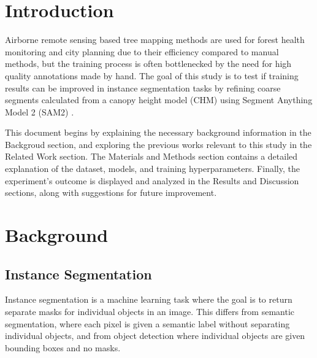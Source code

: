 \documentclass[english, 12pt, a4paper, sci, utf8, a-2b, online]{aaltothesis}
\begin{document}
\cleardoublepage

\section{Introduction}
\label{sec:intro}

\thispagestyle{empty}

Airborne remote sensing based tree mapping methods are used for forest health monitoring \cite{ecke} and city planning \cite{velasquez} due to their efficiency compared to manual methods, but the training process is often bottlenecked by the need for high quality annotations made by hand. 
The goal of this study is to test if training results can be improved in instance segmentation tasks by refining coarse segments calculated from a canopy height model (CHM) using Segment Anything Model 2 (SAM2) \cite{sam2}.

This document begins by explaining the necessary background information in the Backgroud section, and exploring the previous works relevant to this study in the Related Work section. The Materials and Methods section contains a detailed explanation of the dataset, models, and training hyperparameters. Finally, the experiment's outcome is displayed and analyzed in the Results and Discussion sections, along with suggestions for future improvement.

\newpage
\section{Background}

\subsection{Instance Segmentation}

Instance segmentation is a machine learning task where the goal is to return separate masks for individual objects in an image. This differs from semantic segmentation, where each pixel is given a semantic label without separating individual objects, and from object detection where individual objects are given bounding boxes and no masks.
\end{document}

